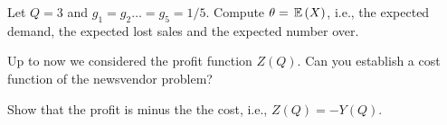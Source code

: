 \begin{exercise}
  Let $Q=3$ and $g_1=g_2\ldots=g_5 = 1/5$. Compute $\theta = \,\mathbb{E}\,(X)$, i.e., the expected demand, the expected lost sales and the expected number over.
  \begin{comment}
    \begin{align*}
      \E( X) &= \sum_{i=1}^5 i g_i = 1/5+2/5+\cdots+5/5 = 3, \\
      \E (\max\{X-Q,0\}) &= \sum_{i=Q+1}^5 (i-Q) g_i = (4-3)/5 + (5-3)/5,\\
      \E (\max\{Q-X,0\}) &= \sum_{i=1}^{Q-1} (Q-i) g_i = (3-1)/5 + (3-2)/5.
    \end{align*}
  \end{comment}
\end{exercise}

\begin{exercise}
  Up to now we considered the profit function $Z(Q)$.  Can you
  establish a cost function of the newsvendor problem?
  \begin{comment}
The expected cost resulting from ordering an amount $Q$ follows
from combining the above formulas:
\begin{equation*}
     Y(Q) = c_o  \E( \max\{Q-X, 0\})  +   c_s \E( \max\{X-Q, 0\}) - c_s\E(X).
\end{equation*}
Note that the expected `cost' of selling $\E(X)$ of items should be subtracted from the cost. Since this term does not depend on the decision variable $Q$, it is often left out of the cost function, but formally it should be there.
  \end{comment}
\end{exercise}


\begin{exercise}
  Show that the profit is minus the the cost, i.e., $Z(Q) = -Y(Q)$.
  \begin{comment}
    Here we go:
    \begin{equation*}
      \begin{split}
        Z(Q) 
&=  -p_bQ+p_s\E(\min\{Q,X\}) + p_e\E(Q-\min\{Q,X\}) \\
&=  (p_e - p_b)Q+ p_s(\E(\min\{Q,X\}) - p_e\E(\min\{Q,X\}) \\
&=  (p_e - p_b)Q+ (p_s-p_e)(\E(\min\{Q,X\})\\
&=  -c_oQ+ (c_o+c_s)(\E(\min\{Q,X\})\\
&=  -c_o( Q - \E(\min\{Q,X\})) - c_s(\E(X) - \E(\min\{Q,X\}) + c_s\E(X)\\
&=  -c_o \E(Q-\min\{Q,X\}) - c_s\E(X-\min\{Q,X\}) + c_s\E(X)\\
&=  -c_o \E(\max\{Q-X,0\}) - c_s\E(\max\{X-Q,0\}) + c_s\E(X)\\
&=  -Y(Q).
      \end{split}
    \end{equation*}
Ensure you understand the last two steps. 
  \end{comment}
\end{exercise}

